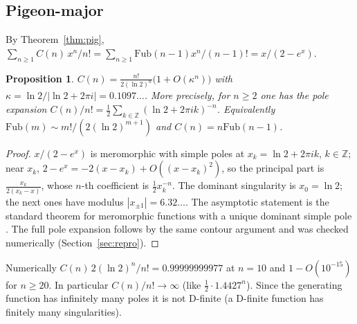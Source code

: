 \documentclass[11pt]{article}
\newtheorem{proposition}{Proposition}
\theoremstyle{definition}
\theoremstyle{remark}
\newcommand{\Fub}{\mathrm{Fub}}
\begin{document}
\subsection{Pigeon-major}
By Theorem~\ref{thm:pig}, $\sum_{n\ge1}C(n)\,x^n/n!=\sum_{n\ge1}\Fub(n-1)x^n/(n-1)!=x/(2-e^x)$.

\begin{proposition}\label{prop:pigasym}
$\displaystyle C(n)=\frac{n!}{2(\ln2)^n}\bigl(1+O(\kappa^n)\bigr)$ with $\kappa=\ln2/|\ln2+2\pi i|=0.1097\ldots$. More precisely,
for $n\ge2$ one has the pole expansion $C(n)/n!=\tfrac12\sum_{k\in\mathbb Z}(\ln2+2\pi ik)^{-n}$. Equivalently
$\Fub(m)\sim m!/(2(\ln2)^{m+1})$ and $C(n)=n\Fub(n-1)$.
\end{proposition}
\begin{proof}
$x/(2-e^x)$ is meromorphic with simple poles at $x_k=\ln2+2\pi ik$, $k\in\mathbb Z$; near $x_k$,
$2-e^x=-2(x-x_k)+O((x-x_k)^2)$, so the principal part is $\tfrac{x_k}{2(x_k-x)}$, whose $n$-th coefficient is $\tfrac12x_k^{-n}$. The
dominant singularity is $x_0=\ln2$; the next ones have modulus $|x_{\pm1}|=6.32\ldots$. The asymptotic statement is the standard
theorem for meromorphic functions with a unique dominant simple pole \cite[Thm.~IV.10]{FS09}. The full
pole expansion follows by the same contour argument and was checked numerically (Section~\ref{sec:repro}).
\end{proof}
Numerically $C(n)\,2(\ln2)^n/n!=0.99999999977$ at $n=10$ and $1-O(10^{-15})$ for $n\ge20$. In particular
$C(n)/n!\to\infty$ (like $\tfrac12\cdot1.4427^n$). Since the generating function has infinitely many poles it is not D-finite (a D-finite
function has finitely many singularities).
\end{document}
